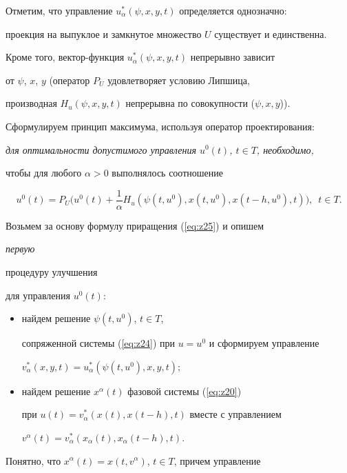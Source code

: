 Отметим, что управление $u_\alpha^*(\psi,x,y,t)$ определяется однозначно:


проекция на выпуклое и замкнутое множество $U$ существует и единственна.


Кроме того, вектор-функция $u_\alpha^*(\psi,x,y,t)$ непрерывно зависит


от $\psi$, $x$, $y$ (оператор $P_U$ удовлетворяет условию Липшица,


производная $H_u(\psi,x,y,t)$ непрерывна по совокупности ($\psi,x,y$)).





Сформулируем принцип максимума, используя оператор проектирования:


{\it для оптимальности допустимого управления $u^0(t)$, $t\in T$, необходимо,


чтобы для любого $\alpha>0$ выполнялось соотношение}


$$


u^0(t)=P_U\bigg(u^0(t)+\frac{1}{\alpha}


H_u(\psi(t,u^0),x(t,u^0),x(t-h,u^0),t)\bigg),\ \; t\in T.


$$





Возьмем за основу формулу приращения (\ref{eq:z25}) и опишем {\it первую


процедуру улучшения} для управления $u^0(t)$:


\begin{itemize}


\item[] найдем решение $\psi(t,u^0)$, $t\in T$,


сопряженной системы (\ref{eq:z24}) при $u=u^0$ и сформируем управление


$v_\alpha^*(x,y,t)=u_\alpha^*(\psi(t,u^0),x,y,t)$;


\item[] найдем решение $x^\alpha(t)$ фазовой системы (\ref{eq:z20})


при $u(t)=v_\alpha^*(x(t),x(t-h),t)$ вместе с управлением


$v^\alpha(t)=v_\alpha^*(x_\alpha(t),x_\alpha(t-h),t)$.


\end{itemize}





Понятно, что $x^\alpha(t)=x(t,v^\alpha)$, $t\in T$, причем управление


